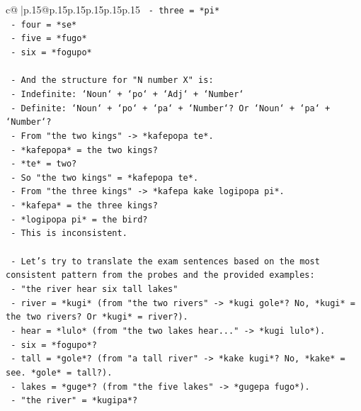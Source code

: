 \documentclass{article}
\begin{document}
{\begin{supertabular}{c@{$\;$}|p{.15\linewidth}@{}p{.15\linewidth}p{.15\linewidth}p{.15\linewidth}p{.15\linewidth}p{.15\linewidth}}
{{{\texttt{              {-} three = *pi*} \\
\texttt{              {-} four = *se*} \\
\texttt{              {-} five = *fugo*} \\
\texttt{              {-} six = *fogupo*} \\
\\ 
\texttt{            {-} And the structure for "N number X" is:} \\
\texttt{              {-} Indefinite: `Noun` + `po` + `Adj` + `Number`} \\
\texttt{              {-} Definite: `Noun` + `po` + `pa` + `Number`? Or `Noun` + `pa` + `Number`?} \\
\texttt{              {-} From "the two kings" {-}> *kafepopa te*.} \\
\texttt{                {-} *kafepopa* = the two kings?} \\
\texttt{                {-} *te* = two?} \\
\texttt{                {-} So "the two kings" = *kafepopa te*.} \\
\texttt{              {-} From "the three kings" {-}> *kafepa kake logipopa pi*.} \\
\texttt{                {-} *kafepa* = the three kings?} \\
\texttt{                {-} *logipopa pi* = the bird?} \\
\texttt{                {-} This is inconsistent.} \\
\\ 
\texttt{            {-} Let's try to translate the exam sentences based on the most consistent pattern from the probes and the provided examples:} \\
\texttt{              {-} "the river hear six tall lakes"} \\
\texttt{                {-} river = *kugi* (from "the two rivers" {-}> *kugi gole*? No, *kugi* = the two rivers? Or *kugi* = river?).} \\
\texttt{                {-} hear = *lulo* (from "the two lakes hear..." {-}> *kugi lulo*).} \\
\texttt{                {-} six = *fogupo*?} \\
\texttt{                {-} tall = *gole*? (from "a tall river" {-}> *kake kugi*? No, *kake* = see. *gole* = tall?).} \\
\texttt{                {-} lakes = *guge*? (from "the five lakes" {-}> *gugepa fugo*).} \\
\texttt{                {-} "the river" = *kugipa*?} \\
}}}
\end{supertabular}}
\end{document}
